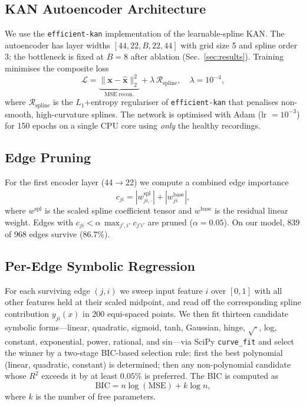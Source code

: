 \documentclass[conference]{IEEEtran}
\begin{document}
\subsection{KAN Autoencoder Architecture}
We use the \texttt{efficient-kan} implementation of the
learnable-spline KAN. The autoencoder has layer widths
$[44,22,B,22,44]$ with grid size 5 and spline order 3;
the bottleneck is fixed at $B{=}8$ after ablation
(Sec.~\ref{sec:results}). Training minimises the composite loss
\begin{equation}
\mathcal{L}
= \underbrace{\|\mathbf{x}-\hat{\mathbf{x}}\|_2^2}_{\text{MSE recon.}}
+ \lambda\,\mathcal{R}_{\text{spline}},
\quad \lambda = 10^{-4},
\end{equation}
where $\mathcal{R}_{\text{spline}}$ is the $L_1$+entropy
regulariser of \texttt{efficient-kan} that penalises
non-smooth, high-curvature splines. The network is optimised
with Adam (lr $=10^{-3}$) for 150 epochs on a single CPU core
using \emph{only} the healthy recordings.

\subsection{Edge Pruning}
For the first encoder layer (44$\to$22) we compute a combined
edge importance
\begin{equation}
c_{ji} = \overline{|w^{\text{spl}}_{ji,\cdot}|}
       + |w^{\text{base}}_{ji}|,
\end{equation}
where $w^{\text{spl}}$ is the scaled spline coefficient tensor
and $w^{\text{base}}$ is the residual linear weight. Edges with
$c_{ji} < \alpha\,\max_{j',i'}c_{j'i'}$ are pruned
($\alpha{=}0.05$). On our model, 839 of 968 edges survive
(86.7\%).

\subsection{Per-Edge Symbolic Regression}
For each surviving edge $(j,i)$ we sweep input feature $i$ over
$[0,1]$ with all other features held at their scaled midpoint,
and read off the corresponding spline contribution
$y_{ji}(x)$ in 200 equi-spaced points. We then fit thirteen
candidate symbolic forms---linear, quadratic, sigmoid, tanh,
Gaussian, hinge, $\sqrt{\cdot}$, log, constant, exponential,
power, rational, and sin---via SciPy \texttt{curve\_fit}
and select the winner by a two-stage BIC-based selection rule:
first the best polynomial (linear, quadratic, constant) is determined;
then any non-polynomial candidate whose $R^2$ exceeds it by at least
$0.05\%$ is preferred. The BIC is computed as
\begin{equation}
\text{BIC} = n\log(\text{MSE}) + k\log n,
\end{equation}
where $k$ is the number of free parameters.
\end{document}
